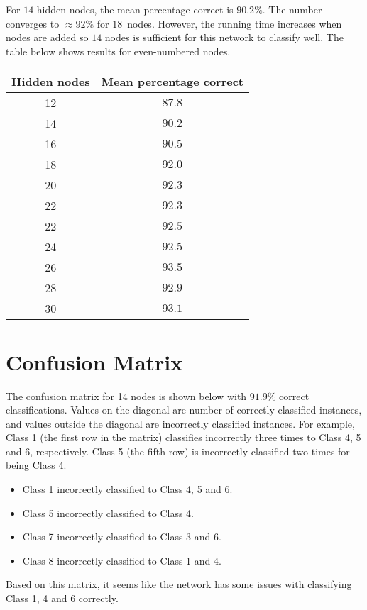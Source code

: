 \documentclass{article}
\begin{document}
\noindent For $14$ hidden nodes, the mean percentage correct is $90.2\%$. The number converges to $\approx 92\%$ for $18$ nodes. However, the running time increases when nodes are added so $14$ nodes is sufficient for this network to classify well. The table below shows results for even-numbered nodes.

\begin{center}
\begin{tabular}{cc}
\toprule
Hidden nodes & Mean percentage correct \\
\midrule
12 & $87.8$\\
14 & $90.2$\\
16 & $90.5$\\
18 & $92.0$\\
20 & $92.3$\\
22 & $92.3$\\
22 & $92.5$\\
24 & $92.5$\\
26 & $93.5$\\
28 & $92.9$\\
30 & $93.1$\\
\bottomrule
\end{tabular}
\end{center}

\section*{Confusion Matrix}

\noindent The confusion matrix for 14 nodes is shown below with $91.9\%$ correct classifications. Values on the diagonal are number of correctly classified instances, and values outside the diagonal are incorrectly classified instances. For example, Class 1 (the first row in the matrix) classifies incorrectly three times to Class 4, 5 and 6, respectively. Class 5 (the fifth row) is incorrectly classified two times for being Class 4.

\begin{itemize}
    \item Class 1 incorrectly classified to Class 4, 5 and 6.
    \item Class 5 incorrectly classified to Class 4.
    \item Class 7 incorrectly classified to Class 3 and 6.
    \item Class 8 incorrectly classified to Class 1 and 4.
\end{itemize}

\noindent Based on this matrix, it seems like the network has some issues with classifying Class 1, 4 and 6 correctly.
\end{document}
